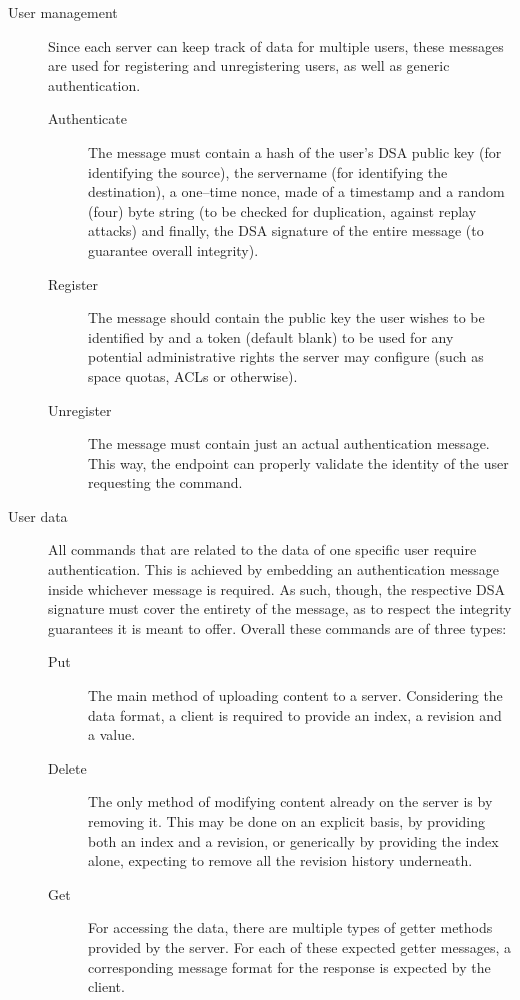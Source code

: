 \begin{description}
  \item[User management] Since each server can keep track of data for multiple users, these messages are used for registering and unregistering users, as well as generic authentication.
  \begin{description}
    \item[Authenticate] The message must contain a hash of the user's DSA public key (for identifying the source), the servername (for identifying the destination), a one--time nonce, made of a timestamp and a random (four) byte string (to be checked for duplication, against replay attacks) and finally, the DSA signature of the entire message (to guarantee overall integrity).
    \item[Register] The message should contain the public key the user wishes to be identified by and a token (default blank) to be used for any potential administrative rights the server may configure (such as space quotas, ACLs or otherwise).
    \item[Unregister] The message must contain just an actual authentication message.
    This way, the endpoint can properly validate the identity of the user requesting the command.
  \end{description}
  \item[User data] All commands that are related to the data of one specific user require authentication.
  This is achieved by embedding an authentication message inside whichever message is required.
  As such, though, the respective DSA signature must cover the entirety of the message, as to respect the integrity guarantees it is meant to offer.
  Overall these commands are of three types:
  \begin{description}
    \item[Put] The main method of uploading content to a server.
    Considering the data format, a client is required to provide an index, a revision and a value.
    \item[Delete] The only method of modifying content already on the server is by removing it.
    This may be done on an explicit basis, by providing both an index and a revision, or generically by providing the index alone, expecting to remove all the revision history underneath.
    \item[Get] For accessing the data, there are multiple types of getter methods provided by the server.
    For each of these expected getter messages, a corresponding message format for the response is expected by the client.

\end{description}
\end{description}
